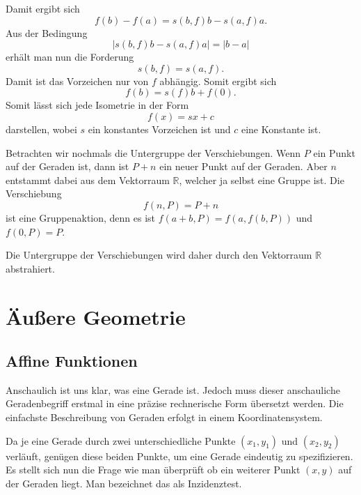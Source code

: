 \documentclass[a4paper,11pt,fleqn,twocolumn,twoside]{article}
\newcommand{\R}{\mathbb R}
\begin{document}
Damit ergibt sich
\begin{equation}
f(b)-f(a) = s(b,f)b-s(a,f)a.
\end{equation}
Aus der Bedingung
\begin{equation}
|s(b,f)b-s(a,f)a| = |b-a|
\end{equation}
erhält man nun die Forderung
\begin{equation}
s(b,f)=s(a,f).
\end{equation}
Damit ist das Vorzeichen nur von $f$ abhängig. Somit ergibt sich
\begin{equation}
f(b) = s(f)b+f(0).
\end{equation}
Somit lässt sich jede Isometrie in der Form
\begin{equation}
f(x) = sx+c
\end{equation}
darstellen, wobei $s$ ein konstantes Vorzeichen ist und $c$ eine
Konstante ist.

Betrachten wir nochmals die Untergruppe der Verschiebungen. Wenn
$P$ ein Punkt auf der Geraden ist, dann ist $P+n$ ein neuer Punkt
auf der Geraden. Aber $n$ entstammt dabei aus dem Vektorraum
$\R$, welcher ja selbst eine Gruppe ist. Die Verschiebung
\begin{equation}
f(n,P) = P+n
\end{equation}
ist eine Gruppenaktion, denn es ist $f(a+b,P)=f(a,f(b,P))$ und $f(0,P)=P$.

Die Untergruppe der Verschiebungen wird daher durch den
Vektorraum $\R$ abstrahiert.

\section{Äußere Geometrie}
\subsection{Affine Funktionen}

Anschaulich ist uns klar, was eine Gerade ist. Jedoch muss dieser
anschauliche Geradenbegriff erstmal in eine präzise rechnerische Form
übersetzt werden. Die einfachste Beschreibung von Geraden erfolgt in
einem Koordinatensystem.

Da je eine Gerade durch zwei unterschiedliche Punkte
$(x_1,y_1)$ und $(x_2,y_2)$ verläuft, genügen diese beiden
Punkte, um eine Gerade eindeutig zu spezifizieren. Es stellt
sich nun die Frage wie man überprüft ob ein weiterer Punkt
$(x,y)$ auf der Geraden liegt. Man bezeichnet das als Inzidenztest.
\end{document}
